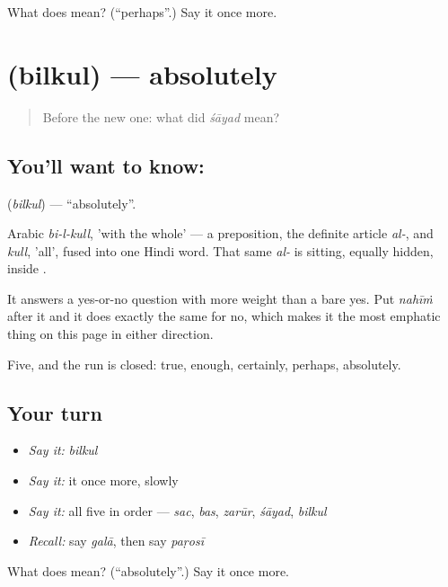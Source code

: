 \begin{tcolorbox}[breakable,colback=teal!4,colframe=teal!35!black,title={Before you move on}]
What does  mean? (\textquotedblleft{}perhaps\textquotedblright{}.) Say it once more.
\end{tcolorbox}
\section[\texorpdfstring{\hi{बिलकुल} (bilkul)}{बिलकुल (bilkul)}]{ (bilkul) — absolutely}

\label{lesson:HI-C48-absolutely}



\begin{quote}
Before the new one: what did \emph{śāyad} mean?
\end{quote}

\subsection*{You'll want to know: }
\textbf{} (\emph{bilkul}) — \textquotedblleft{}absolutely\textquotedblright{}.

Arabic \emph{bi-l-kull}, 'with the whole' — a preposition, the definite article \emph{al-}, and \emph{kull}, 'all', fused into one Hindi word. That same \emph{al-} is sitting, equally hidden, inside .

It answers a yes-or-no question with more weight than a bare yes. Put \emph{nahīṁ} after it and it does exactly the same for no, which makes it the most emphatic thing on this page in either direction.

\begin{grammarlens}[title={What you've built}]
Five, and the run is closed: true, enough, certainly, perhaps, absolutely.
\end{grammarlens}

\subsection*{Your turn}
\begin{itemize}
\raggedright
  \item \emph{Say it:} \emph{bilkul}
  \item \emph{Say it:} it once more, slowly
  \item \emph{Say it:} all five in order — \emph{sac}, \emph{bas}, \emph{zarūr}, \emph{śāyad}, \emph{bilkul}
  \item \emph{Recall:} say \emph{galā}, then say \emph{paṛosī}
\end{itemize}

\begin{tcolorbox}[breakable,colback=teal!4,colframe=teal!35!black,title={Before you move on}]
What does  mean? (\textquotedblleft{}absolutely\textquotedblright{}.) Say it once more.
\end{tcolorbox}

